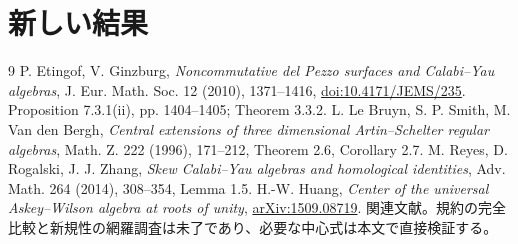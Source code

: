 \documentclass[11pt,a4paper]{ltjsarticle}
\theoremstyle{remark}\newtheorem{remark}[theorem]{注意}
\begin{document}
\section{新しい結果}


\begin{thebibliography}{9}
 P. Etingof, V. Ginzburg,
\emph{Noncommutative del Pezzo surfaces and Calabi--Yau algebras},
J. Eur. Math. Soc. 12 (2010), 1371--1416,
\href{https://doi.org/10.4171/JEMS/235}{doi:10.4171/JEMS/235}.
Proposition 7.3.1(ii), pp. 1404--1405; Theorem 3.3.2.
 L. Le Bruyn, S. P. Smith, M. Van den Bergh,
\emph{Central extensions of three dimensional Artin--Schelter regular algebras},
Math. Z. 222 (1996), 171--212, Theorem 2.6, Corollary 2.7.
 M. Reyes, D. Rogalski, J. J. Zhang,
\emph{Skew Calabi--Yau algebras and homological identities},
Adv. Math. 264 (2014), 308--354, Lemma 1.5.
 H.-W. Huang,
\emph{Center of the universal Askey--Wilson algebra at roots of unity},
\href{https://arxiv.org/abs/1509.08719}{arXiv:1509.08719}.
関連文献。規約の完全比較と新規性の網羅調査は未了であり、必要な中心式は本文で直接検証する。
\end{thebibliography}
\end{document}
